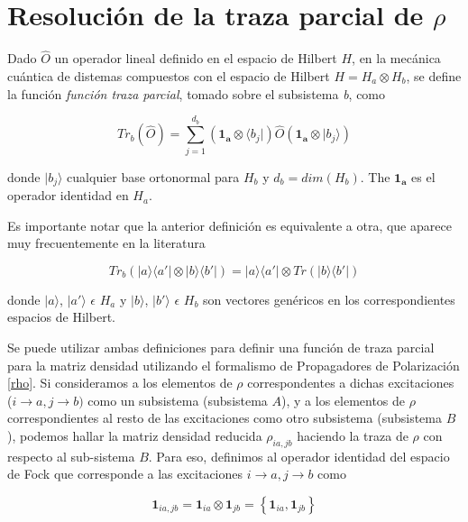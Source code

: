 \documentclass[
	12pt, %
]{fphw}
\begin{document}
\section*{Resolución de la traza parcial de $\rho$}

Dado $\hat{O}$ un operador lineal definido en el espacio de Hilbert $H$, en la mecánica cuántica de distemas compuestos 
con el espacio de Hilbert $H = H_a \otimes H_b$, se define la función \textit{función
traza parcial}, tomado sobre el subsistema \textit{b}, como \cite{RDM}

\begin{equation}\label{Tr_b}
	Tr_b(\hat{O}) = \sum_{j=1}^{d_b} (\bm{1_a} \otimes \langle b_j|) \hat{O} (\bm{1_a} \otimes |b_j \rangle)
\end{equation}

donde $|b_j\rangle$ cualquier base ortonormal para $H_b$ y $d_b= dim(H_b)$. The $\bm{1_a}$ es el operador identidad en $H_a$.

Es importante notar que la anterior definición es equivalente a otra, que aparece muy frecuentemente en la literatura\cite{RDM} \cite{Nielsen_Chuang}

\begin{equation}\label{Tr_b_2}
	Tr_b( |a \rangle \langle a' | \otimes | b\rangle \langle b' | ) = |a \rangle \langle a' | \otimes Tr (|b\rangle \langle b' |)
\end{equation}

donde $|a \rangle$, $|a' \rangle$ $\epsilon$ $H_a$ y $|b\rangle$, $|b'\rangle$ $\epsilon$ $H_b$ son vectores genéricos en 
los correspondientes espacios de Hilbert.

Se puede utilizar ambas definiciones para definir una función de traza parcial para la matriz densidad utilizando 
el formalismo de Propagadores de Polarización \ref{rho}. 
Si consideramos a los elementos de $\rho$ correspondentes a dichas excitaciones ($i\rightarrow a, j \rightarrow b)$ como un subsistema 
(subsistema $A$), 
y a los elementos de $\rho$ correspondientes al resto de las excitaciones como otro subsistema (subsistema $B$), podemos
hallar la matriz densidad reducida $\rho_{ia,jb}$ haciendo la traza de $\rho$ con respecto al sub-sistema $B$. %
Para eso, definimos al operador identidad del espacio de 
Fock que corresponde a las excitaciones $i\rightarrow a,j\rightarrow b$ como 

\begin{equation}
	\bm{1}_{ia,jb} = \bm{1}_{ia} \otimes \bm{1}_{jb} = \left\{  \bm{1}_{ia} ,  \bm{1}_{jb} \right\}
\end{equation}
\end{document}
